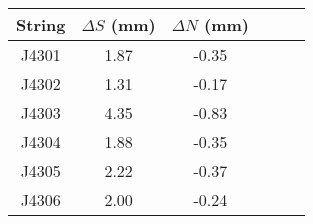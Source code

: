 \begin{tabular}{cccccc}
\toprule
String &  $\Delta S$ (mm) &  $\Delta N$ (mm) \\
\midrule
 J4301 &             1.87 &            -0.35 \\
 J4302 &             1.31 &            -0.17 \\
 J4303 &             4.35 &            -0.83 \\
 J4304 &             1.88 &            -0.35 \\
 J4305 &             2.22 &            -0.37 \\
 J4306 &             2.00 &            -0.24 \\
\bottomrule
\end{tabular}

